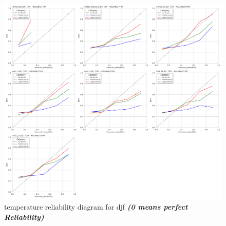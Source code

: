 \begin{figure}[H]
    \centering
    \includegraphics[width=1\linewidth]{plots/prob/rela/rela_diagram_t2m_djf.png}
    \caption{temperature reliability diagram for djf \textbf{\textit{(0 means perfect Reliability)}}}
\end{figure}

